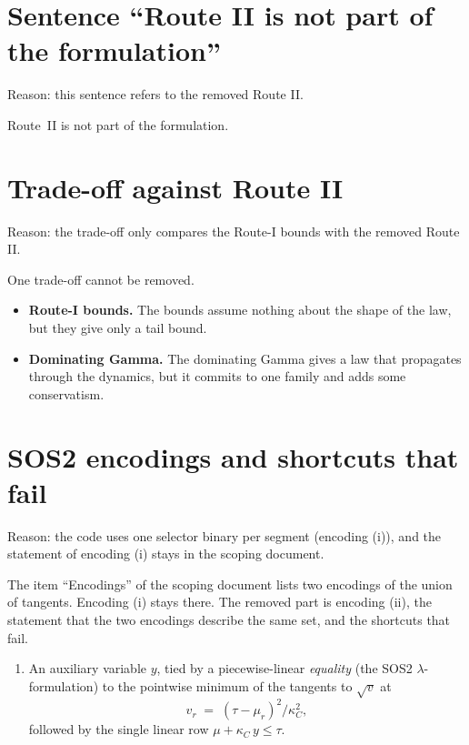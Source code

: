\documentclass[11pt,a4paper]{article}
\theoremstyle{plain}
\theoremstyle{definition}
\theoremstyle{remark}
\begin{document}
\section{Sentence ``Route II is not part of the formulation''}

Reason: this sentence refers to the removed Route II.

Route~II is not part of the formulation.

\section{Trade-off against Route II}

Reason: the trade-off only compares the Route-I bounds with the removed Route II.

One trade-off cannot be removed.
\begin{itemize}
  \item \textbf{Route-I bounds.} The bounds assume nothing about the shape of the law, but they give only a tail bound.
  \item \textbf{Dominating Gamma.} The dominating Gamma gives a law that propagates through the dynamics, but it commits to one family and adds some conservatism.
\end{itemize}

\section{SOS2 encodings and shortcuts that fail}

Reason: the code uses one selector binary per segment (encoding (i)), and the statement of encoding (i) stays in the scoping document.

The item ``Encodings'' of the scoping document lists two encodings of the union of tangents.
Encoding (i) stays there.
The removed part is encoding (ii), the statement that the two encodings describe the same set, and the shortcuts that fail.

\begin{enumerate}[label=(\roman*),start=2]
      \item An auxiliary variable $y$, tied by a piecewise-linear \emph{equality} (the SOS2 $\lambda$-formulation) to the pointwise minimum of the tangents to $\sqrt{v}$ at
        \begin{equation}
          v_r \;=\; (\tau - \mu_r)^2/\kappa_C^2,
        \end{equation}
        followed by the single linear row $\mu + \kappa_C\, y \le \tau$.
\end{enumerate}
\end{document}
